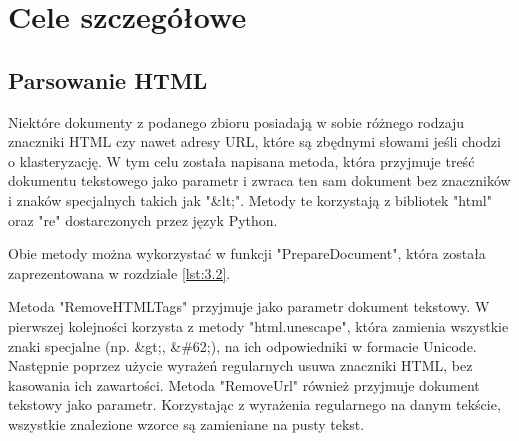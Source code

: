 \section{Cele szczegółowe}
    \subsection{Parsowanie HTML}
    Niektóre dokumenty z podanego zbioru posiadają w sobie różnego rodzaju znaczniki HTML czy nawet adresy URL, które są zbędnymi słowami jeśli chodzi o klasteryzację. W tym celu została napisana metoda, która przyjmuje treść dokumentu tekstowego jako parametr i zwraca ten sam dokument bez znaczników i znaków specjalnych takich jak "\&lt;". Metody te korzystają z bibliotek "html" oraz "re" dostarczonych przez język Python.
    
       
    
    Obie metody można wykorzystać w funkcji "PrepareDocument", która została zaprezentowana w rozdziale \ref{lst:3.2}.
    
    Metoda "RemoveHTMLTags" przyjmuje jako parametr dokument tekstowy. W pierwszej kolejności korzysta z metody "html.unescape", która zamienia wszystkie znaki specjalne (np. \&gt;, \&\#62;), na ich odpowiedniki w formacie Unicode.  Następnie poprzez użycie wyrażeń regularnych usuwa znaczniki HTML, bez kasowania ich zawartości. Metoda "RemoveUrl" również przyjmuje dokument tekstowy jako parametr. Korzystając z wyrażenia regularnego na danym tekście, wszystkie znalezione wzorce są zamieniane na pusty tekst.
    
    
